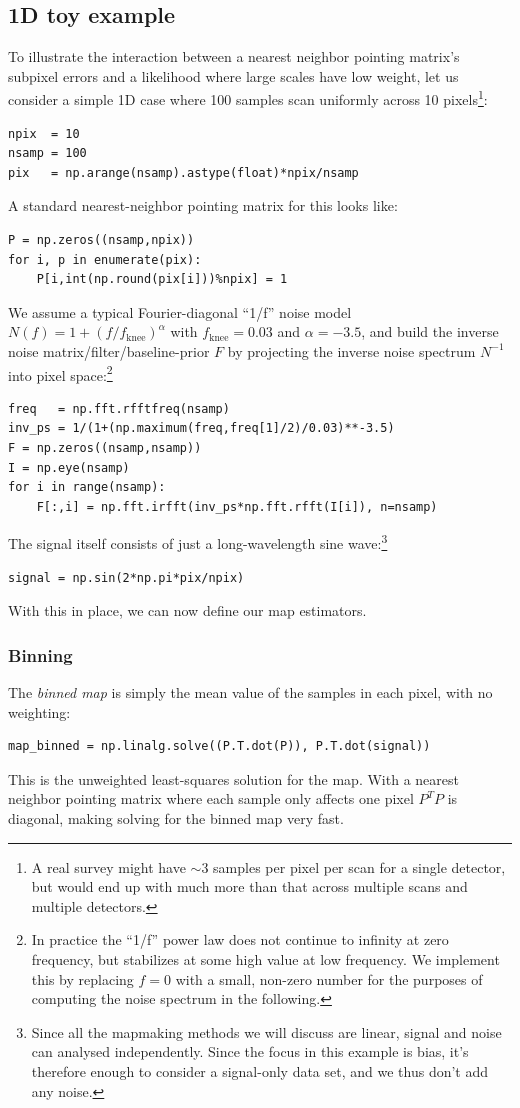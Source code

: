 \documentclass[twocolumn,apj]{aastex63}
\begin{document}
\subsection{1D toy example}
To illustrate the interaction between a nearest neighbor pointing matrix's
subpixel errors and a likelihood where large scales have low weight, let
us consider a simple 1D case where 100 samples scan uniformly across 10 pixels\footnote{
A real survey might have $\sim 3$ samples per pixel per scan for a single detector,
but would end up with much more than that across multiple scans and multiple detectors.}:
\begin{lstlisting}
npix  = 10
nsamp = 100
pix   = np.arange(nsamp).astype(float)*npix/nsamp
\end{lstlisting}
A standard nearest-neighbor pointing matrix for this looks like:
\begin{lstlisting}
P = np.zeros((nsamp,npix))
for i, p in enumerate(pix):
	P[i,int(np.round(pix[i]))%npix] = 1
\end{lstlisting}
We assume a typical Fourier-diagonal ``1/f'' noise model
$N(f) = 1+(f/f_\text{knee})^\alpha$
with $f_\text{knee}=0.03$ and $\alpha=-3.5$, and build the
inverse noise matrix/filter/baseline-prior $F$ by
projecting the inverse noise spectrum $N^{-1}$ into pixel space:\footnote{
	In practice the ``1/f'' power law does not continue to infinity at zero
	frequency, but stabilizes at some high value at low frequency. We implement
	this by replacing $f=0$ with a small, non-zero number for the purposes of
	computing the noise spectrum in the following.
}
\begin{lstlisting}
freq   = np.fft.rfftfreq(nsamp)
inv_ps = 1/(1+(np.maximum(freq,freq[1]/2)/0.03)**-3.5)
F = np.zeros((nsamp,nsamp))
I = np.eye(nsamp)
for i in range(nsamp):
	F[:,i] = np.fft.irfft(inv_ps*np.fft.rfft(I[i]), n=nsamp)
\end{lstlisting}
The signal itself consists of just a long-wavelength sine wave:\footnote{
Since all the mapmaking methods we will discuss are linear,
signal and noise can analysed independently. Since the focus
in this example is bias, it's therefore enough to consider a
signal-only data set, and we thus don't add any noise.}
\begin{lstlisting}
signal = np.sin(2*np.pi*pix/npix)
\end{lstlisting}

With this in place, we can now define our map estimators.

\subsubsection{Binning}
The \emph{binned map} is simply the mean value of the samples
in each pixel, with no weighting:
\begin{lstlisting}
map_binned = np.linalg.solve((P.T.dot(P)), P.T.dot(signal))
\end{lstlisting}
This is the unweighted least-squares solution for the map.
With a nearest neighbor pointing matrix where each sample
only affects one pixel $P^TP$ is diagonal, making solving
for the binned map very fast.
\end{document}

